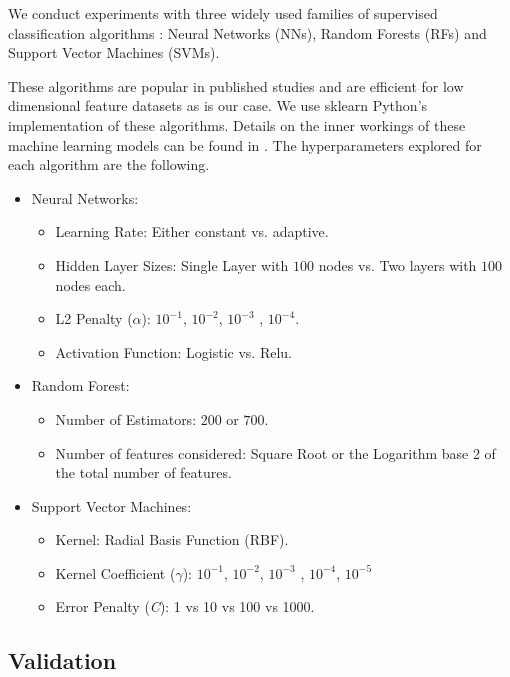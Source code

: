\documentclass[usenatbib]{mnras}
\begin{document}
We conduct experiments with three widely used families of supervised classification 
algorithms \citep{skysurvey, 1601.03931}: Neural Networks (NNs), Random Forests (RFs) and Support
Vector Machines (SVMs). 

These algorithms are popular in published studies and are efficient 
for low dimensional feature datasets as is our case. 
We use sklearn \citep{1201.0490} Python's implementation of these algorithms.
Details on the inner workings of these machine learning models can be
found in \cite{9780387848570}.  
The hyperparameters explored for each algorithm are the
following. 

\begin{itemize}
\item Neural Networks:
\begin{itemize}
\item Learning Rate: Either constant vs. adaptive.
\item Hidden Layer Sizes: Single Layer with $100$ nodes vs. Two layers with
  $100$ nodes each.
\item L2 Penalty ($\alpha$): 
  $10^{-1}$, $10^{-2}$, $10^{-3}$ , $10^{-4}$.
\item Activation Function: Logistic vs. Relu.
\end{itemize}

\item Random Forest:
\begin{itemize}
    \item Number of Estimators: $200$ or $700$.
    \item Number of features considered: Square Root or the Logarithm 
    base 2 of the total number of features.
\end{itemize}

\item Support Vector Machines:
\begin{itemize}
    \item Kernel: Radial Basis Function (RBF).
    \item Kernel Coefficient ($\gamma$):  
      $10^{-1}$, $10^{-2}$, $10^{-3}$ , $10^{-4}$, $10^{-5}$
    \item Error Penalty (\textit{C}): 1 vs 10 vs 100 vs 1000. 
\end{itemize}
\end{itemize}

\subsection{Validation} \label{subsection_importances}
\end{document}
